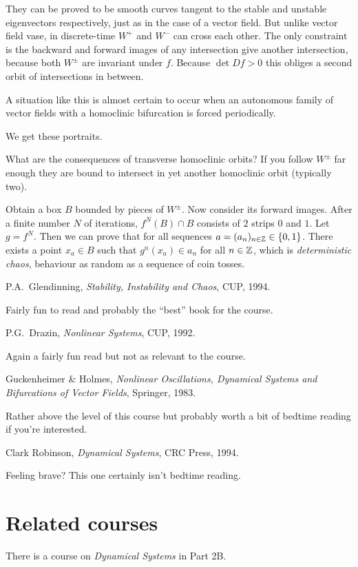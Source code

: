 \documentclass{notes}
\theoremstyle{plain}
\begin{document}
\parbox{3in}{%
They can be proved to be smooth curves tangent to the stable and unstable
eigenvectors respectively, just as in the case of a vector field.  But unlike
vector field vase, in discrete-time $W^+$ and $W^-$ can cross each other.
The only constraint is the backward and forward images of any intersection
give another intersection, because both $W^\pm$ are invariant under $f$.
Because $\det Df > 0$ this obliges a second orbit of intersections in between.}

\begin{flushright}
\parbox{3in}{%
A situation like this is almost certain to occur when an
autonomous family of vector fields with a homoclinic bifurcation is forced
periodically.}
\end{flushright}

We get these portraits.

\vspace*{5in}

What are the consequences of transverse homoclinic orbits?  If you follow
$W^\pm$ far enough they are bound to intersect in yet another homoclinic
orbit (typically two).

\vspace{2in}

Obtain a box $B$ bounded by pieces of $W^\pm$.  Now consider its forward
images.  After a finite number $N$ of iterations, $f^N(B) \cap B$ consists
of $2$ strips $0$ and $1$.  Let $g = f^N$.  Then we can prove that
for all sequences $a = (a_n)_{n \in \mathbb{Z}} \in \{ 0,1 \}$.  There exists a point
$x_a \in B$ such that $g^n(x_a) \in a_n$ for all $n \in \mathbb{Z}$, which is
\emph{deterministic chaos}, behaviour as random as a sequence of coin tosses.

\backmatter

\begin{thebibliography}{9}
  
 P.A.~Glendinning, \emph{Stability, Instability
    and Chaos}, CUP, 1994.
  
  {\sffamily \small Fairly fun to read and probably the ``best'' book
    for the course. }

 P.G.~Drazin, \emph{Nonlinear Systems}, CUP, 1992.
  
  {\sffamily \small Again a fairly fun read but not as
    relevant to the course. }

 Guckenheimer \& Holmes, \emph{Nonlinear Oscillations,
    Dynamical Systems and Bifurcations of Vector Fields}, Springer,
  1983.
  
  {\sffamily \small Rather above the level of this course but probably
    worth a bit of bedtime reading if you're interested. }

 Clark Robinson, \emph{Dynamical Systems}, CRC
  Press, 1994.
  
  { \sffamily \small Feeling brave?  This one certainly isn't bedtime
  reading. }

\end{thebibliography}

\section*{Related courses}

There is a course on \emph{Dynamical Systems} in Part 2B.
\end{document}
